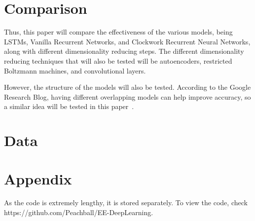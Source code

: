 \documentclass{article}
\begin{document}
\section{Comparison}
Thus, this paper will compare the effectiveness of the various models, being
LSTMs, Vanilla Recurrent Networks, and Clockwork Recurrent Neural Networks,
along with different dimensionality reducing steps. The different dimensionality
reducing techniques that will also be tested will be autoencoders, restricted
Boltzmann machines, and convolutional layers.

However, the structure of the models will also be tested. According to the
Google Research Blog, having different overlapping models can help improve
accuracy, so a similar idea will be tested in this paper~\cite{widendeep}.
\section{Data}

\section{Appendix}
As the code is extremely lengthy, it is stored separately. To view the code,
check https://github.com/Peachball/EE-DeepLearning.
\end{document}
